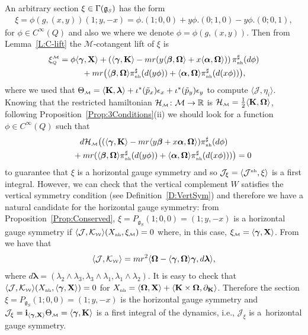\documentclass[pdftex]{sigma}
\numberwithin{equation}{section}
\def\W{\mathcal{W}}
\def\M{\mathcal{M}}
\def\J{\mathcal{J}}
\def\Ham{\mathcal{H}}
\def\R{\mathbb{R}}
\def\g{\mathfrak{g}}
\def\nh{{\mbox{\tiny{nh}}}}
\def\subW{{\mbox{\tiny{$\W$}}}}
\def\subM{{\mbox{\tiny{$\M$}}}}
\def\subSS{{\mbox{\tiny{$S$}}}}
\def\subQQ{{\mbox{\tiny{$Q$}}}}
\def\vecOm{\boldsymbol{\Omega}}
\def\vecL{\boldsymbol{\lambda}}
\def\vecgamma{\boldsymbol{\gamma}}
\def\vecalpha{\boldsymbol{\alpha}}
\def\vecbeta{\boldsymbol{\beta}}
\begin{document}
An arbitrary section $\xi\in \Gamma(\g_\subSS)$ has the form
\begin{gather*}
\xi = \phi(g,(x,y)) (1; y,-x)= \phi.(1;0,0) + y \phi. (0;1,0) - y \phi.(0;0,1),
\end{gather*}
for $\phi\in C^\infty(Q)$ and also we where we denote $\phi = \phi(g,(x,y))$.
Then from Lemma~\ref{L:C-lift} the $\M$-cotangent lift of $\xi$  is
\begin{gather*}
  \xi_\subQQ^\subM =     \phi \langle \vecgamma, {\bf X} \rangle  + \left(  \langle \vecgamma, {\bf K} \rangle -  mr(y \langle \vecbeta,\vecOm\rangle +  x\langle \vecalpha,\vecOm\rangle)  \right) \pi_\nh^\sharp (d\phi) \\
\hphantom{\xi_\subQQ^\subM = }{} + mr \big( \langle \vecbeta,\vecOm\rangle \pi_\nh^\sharp(d(y\phi)) +  \langle \vecalpha,\vecOm\rangle \pi_\nh^\sharp(d(x\phi)) \big),
\end{gather*}
where we used that $\Theta_\subM = \langle {\bf K}, \vecL \rangle + \iota^* (\tilde p_x) \epsilon_x + \iota^*(\tilde p_y) \epsilon_y$ to compute $\langle \J, \eta_i\rangle$.
Knowing that the restricted hamiltonian $\Ham_\subM\colon \M\to \R$ is $\Ham_\subM = \frac{1}{2} \langle {\bf K},  \vecOm \rangle$, following Proposition~\ref{Prop:3Conditions}(ii) we should look for a function $\phi\in C^\infty(Q)$ such that
\begin{gather*}
d\Ham_\subM \big((\langle \vecgamma, {\bf K} \rangle -  mr\langle y\vecbeta + x\vecalpha ,\vecOm\rangle   ) \pi_\nh^\sharp (d\phi)\\
 \qquad{} + mr ( \langle \vecbeta,\vecOm\rangle \pi_\nh^\sharp(d(y\phi)) +  \langle \vecalpha,\vecOm\rangle \pi_\nh^\sharp(d(x\phi)) ) \big) = 0
\end{gather*}
to guarantee that $\xi$ is a horizontal gauge symmetry and so $\J_\xi = \langle \J^\nh, \xi\rangle$ is a f\/irst integral.  However, we can check that the vertical complement $W$ satisf\/ies the vertical symmetry condition (see Def\/inition~\ref{D:VertSym}) and therefore we have a natural candidate for the horizontal gauge symmetry: from Proposition~\ref{Prop:Conserved}, $\xi = P_{\g_S}(1;0,0) = (1; y, -x)$ is a horizontal gauge symmetry if $\langle \mathcal{J},\mathcal{K}_\subW\rangle (X_{\nh}, \xi_\subM )=0$ where, in this case, $\xi_\subM = \langle \vecgamma, {\bf X}\rangle$.  From \cite{Paula} we have that
\begin{gather*}
\langle \J,\mathcal{K}_\subW \rangle = mr^2 \langle \vecOm - \langle \vecgamma,\vecOm \rangle\vecgamma , d\vecL \rangle,
\end{gather*}
where $d\vecL = (\lambda_2\wedge\lambda_3, \lambda_3\wedge\lambda_1, \lambda_1\wedge\lambda_2)$. It is easy to check that $\langle \mathcal{J},\mathcal{K}_\subW\rangle (X_{\nh},\langle \vecgamma, {\bf X} \rangle )=0$ for $X_\nh = \langle \vecOm, {\bf X} \rangle + \langle {\bf K}\times \vecOm , \partial_{\bf K} \rangle$. Therefore the section $\xi = P_{\g_S}(1;0,0) = (1; y, -x)$ is the horizontal gauge symmetry and $\J_\xi = {\bf i}_{\langle \vecgamma, {\bf X} \rangle} \Theta_\subM = \langle \vecgamma, {\bf K} \rangle$ is a f\/irst integral of the dynamics, i.e., $\J_\xi$ is a~horizontal gauge symmetry.
\end{document}
